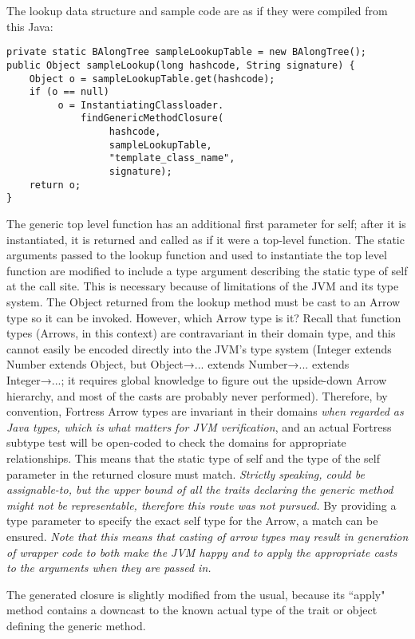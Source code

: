 \documentclass[11pt]{article}
\def\RARW{\mbox{\fontspec{STIXGeneral}→}}
\begin{document}
The lookup data structure and sample code are as if they were compiled from this Java:
\begin{verbatim}
private static BAlongTree sampleLookupTable = new BAlongTree();
public Object sampleLookup(long hashcode, String signature) {
    Object o = sampleLookupTable.get(hashcode);
    if (o == null) 
         o = InstantiatingClassloader.
             findGenericMethodClosure(
                  hashcode,
                  sampleLookupTable,
                  "template_class_name",
                  signature);
    return o;
}
\end{verbatim}

The generic top level function has an additional first parameter for self; after it is instantiated, it is returned and called as if it were a top-level function.  The static arguments passed to the lookup function and used to instantiate the top level function are modified to include a type argument describing the static type of self at the call site.  This is necessary because of limitations of the JVM and its type system.  The Object returned from the lookup method must be cast to an Arrow type so it can be invoked.  However, which Arrow type is it?  Recall that function types (Arrows, in this context) are contravariant in their domain type, and this cannot easily be encoded directly into the JVM's type system (Integer extends Number extends Object, but Object\RARW... extends Number\RARW... extends Integer\RARW...; it requires global knowledge to figure out the upside-down Arrow hierarchy, and most of the casts are probably never performed).  Therefore, by convention, Fortress Arrow types are invariant in their domains {\it when regarded as Java types, which is what matters for JVM verification}, and an actual Fortress subtype test will be open-coded to check the domains for appropriate relationships.  This means that the static type of self and the type of the self parameter in the returned closure must match.  {\it Strictly speaking, could be assignable-to, but the upper bound of all the traits declaring the generic method might not be representable, therefore this route was not pursued.}  By providing a type parameter to specify the exact self type for the Arrow, a match can be ensured.  {\it Note that this means that casting of arrow types may result in generation of wrapper code to both make the JVM happy and to apply the appropriate casts to the arguments when they are passed in.}

The generated closure is slightly modified from the usual, because its ``apply" method contains a downcast to the known actual type of the trait or object defining the generic method.
\end{document}
